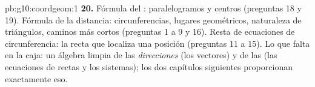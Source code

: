 \begin{solution}{pb:g10:coordgeom:1}
\textbf{20.} Fórmula del : paralelogramos y centros (preguntas
18 y 19). Fórmula de la distancia: circunferencias, lugares geométricos,
naturaleza de triángulos, caminos más cortos (preguntas 1 a 9 y 16).
Resta de ecuaciones de circunferencia: la recta que localiza una posición
(preguntas 11 a 15). Lo que falta en la caja: un álgebra limpia de las
\emph{direcciones} (los vectores) y de las \emph{} (las
ecuaciones de rectas y los sistemas); los dos capítulos siguientes
proporcionan exactamente eso.
\end{solution}
